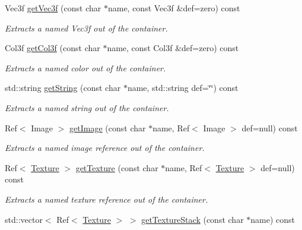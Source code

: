 \begin{DoxyCompactItemize}
Vec3f \hyperlink{classembree_1_1_parms_a137f0e81fa90efde4cae338eecf0898e}{getVec3f} (const char $\ast$name, const Vec3f \&def=zero) const 
\begin{DoxyCompactList}\small\item\em Extracts a named Vec3f out of the container. \item\end{DoxyCompactList}\item 
Col3f \hyperlink{classembree_1_1_parms_a00fac023bc620ff533df312007872081}{getCol3f} (const char $\ast$name, const Col3f \&def=zero) const 
\begin{DoxyCompactList}\small\item\em Extracts a named color out of the container. \item\end{DoxyCompactList}\item 
std::string \hyperlink{classembree_1_1_parms_aac3a445b1a5c98537297e8b6f9face65}{getString} (const char $\ast$name, std::string def=\char`\"{}\char`\"{}) const 
\begin{DoxyCompactList}\small\item\em Extracts a named string out of the container. \item\end{DoxyCompactList}\item 
Ref$<$ Image $>$ \hyperlink{classembree_1_1_parms_acdf69b87c0288b6acb2e2da27c825793}{getImage} (const char $\ast$name, Ref$<$ Image $>$ def=null) const 
\begin{DoxyCompactList}\small\item\em Extracts a named image reference out of the container. \item\end{DoxyCompactList}\item 
Ref$<$ \hyperlink{classembree_1_1_texture}{Texture} $>$ \hyperlink{classembree_1_1_parms_aafbcf77bcc2bdecdcb550372f77166ab}{getTexture} (const char $\ast$name, Ref$<$ \hyperlink{classembree_1_1_texture}{Texture} $>$ def=null) const 
\begin{DoxyCompactList}\small\item\em Extracts a named texture reference out of the container. \item\end{DoxyCompactList}\item 
std::vector$<$ Ref$<$ \hyperlink{classembree_1_1_texture}{Texture} $>$ $>$ \hyperlink{classembree_1_1_parms_a882e92d8b5e65b04d209171e109c7792}{getTextureStack} (const char $\ast$name) const 

\end{DoxyCompactItemize}
